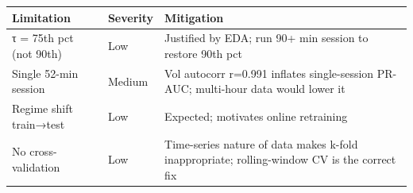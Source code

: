 \documentclass[
]{article}
\begin{document}
\begin{longtable}[]{@{}
  >{\raggedright\arraybackslash}p{}
  >{\raggedright\arraybackslash}p{}
  >{\raggedright\arraybackslash}p{}@{}}
\toprule
Limitation & Severity & Mitigation \\
\midrule
\endhead
τ = 75th pct (not 90th) & Low & Justified by EDA; run 90+ min session to
restore 90th pct \\
Single 52-min session & Medium & Vol autocorr r=0.991 inflates
single-session PR-AUC; multi-hour data would lower it \\
Regime shift train→test & Low & Expected; motivates online retraining \\
No cross-validation & Low & Time-series nature of data makes k-fold
inappropriate; rolling-window CV is the correct fix \\
\bottomrule
\end{longtable}
\end{document}
